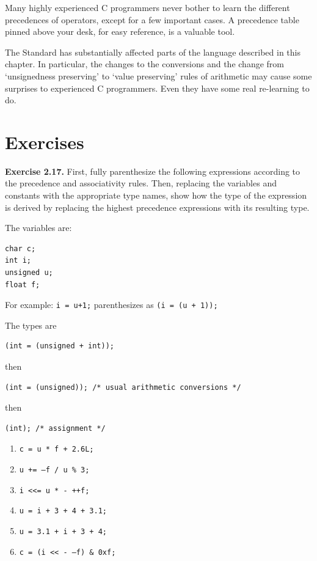  Many highly experienced C programmers never bother to learn the
   different precedences of operators, except for a few important cases. A
   precedence table pinned above your desk, for easy reference, is a valuable
   tool.


  The Standard has substantially affected parts of the language described
   in this chapter. In particular, the changes to the conversions and the
   change from `unsignedness preserving' to `value preserving'
   rules of arithmetic may cause some surprises to experienced
   C programmers.  Even they have some real re-learning to do.


 
        \section{Exercises}
        


  \textbf{Exercise 2.17.} First, fully parenthesize the following expressions according to the
    precedence and associativity rules. Then, replacing the variables and
    constants with the appropriate type names, show how the type of the
    expression is derived by replacing the highest precedence expressions with
    its resulting type.

The variables are:

\begin{Verbatim}
char c;
int i;
unsigned u;
float f;
\end{Verbatim}
For example: \texttt{i = u+1;} parenthesizes
    as \texttt{(i = (u + 1));}

The types are

\begin{Verbatim}
(int = (unsigned + int));
\end{Verbatim}
then

\begin{Verbatim}
(int = (unsigned)); /* usual arithmetic conversions */
\end{Verbatim}
then

\begin{Verbatim}
(int); /* assignment */
\end{Verbatim}
\begin{enumerate}
    \item \texttt{c = u * f + 2.6L;}
    \item \texttt{u += --f / u \% 3;}
    \item \texttt{i <{}<= u * - ++f;}
    \item \texttt{u = i + 3 + 4 + 3.1;}
    \item \texttt{u = 3.1 + i + 3 + 4;}
    \item \texttt{c = (i <{}< - --f) \& 0xf;}
   \end{enumerate}

